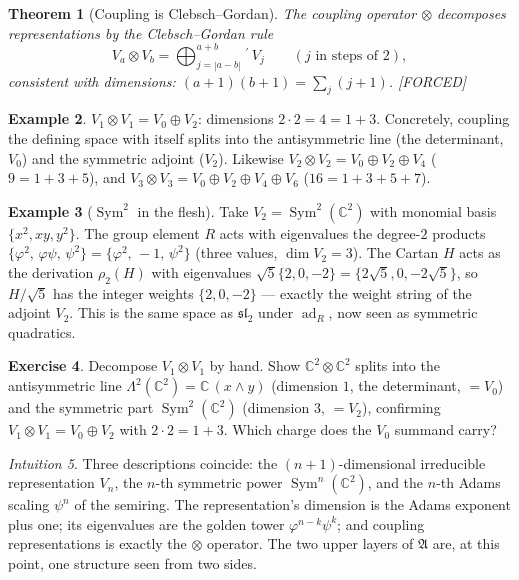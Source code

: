 \documentclass[11pt]{article}
\newcommand{\A}{𝔄}
\theoremstyle{plain}
\newtheorem{theorem}{Theorem}[section]
\theoremstyle{definition}
\newtheorem{example}[theorem]{Example}
\newtheorem{exercise}[theorem]{Exercise}
\theoremstyle{remark}
\newtheorem{intuition}[theorem]{Intuition}
\newcommand{\Forced}{\textcolor{forcedc}{[FORCED]}}
\newcommand{\ad}{\operatorname{ad}}
\begin{document}
\begin{theorem}[Coupling is Clebsch--Gordan]\label{thm:cg}
The coupling operator $⊗$ decomposes representations by the Clebsch--Gordan rule
\[
V_a⊗V_b=\bigoplus_{j=|a-b|}^{a+b}\!{}^{\,\prime}\,V_j\qquad(\text{$j$ in steps of }2),
\]
consistent with dimensions: $(a+1)(b+1)=\sum_j(j+1)$. \Forced
\end{theorem}

\begin{example}\label{ex:cg}
$V_1⊗V_1=V_0⊕V_2$: dimensions $2\cdot2=4=1+3$. Concretely, coupling the defining space with itself splits into the antisymmetric line (the determinant, $V_0$) and the symmetric adjoint ($V_2$). Likewise $V_2⊗V_2=V_0⊕V_2⊕V_4$ ($9=1+3+5$), and $V_3⊗V_3=V_0⊕V_2⊕V_4⊕V_6$ ($16=1+3+5+7$).
\end{example}

\begin{example}[$\operatorname{Sym}^{2}$ in the flesh]\label{ex:sym2}
Take $V_2=\operatorname{Sym}^{2}(ℂ^{2})$ with monomial basis $\{x^{2},xy,y^{2}\}$. The group element $R$ acts with eigenvalues the degree-$2$ products $\{φ^{2},\,φψ,\,ψ^{2}\}=\{φ^{2},\,-1,\,ψ^{2}\}$ (three values, $\dim V_2=3$). The Cartan $H$ acts as the derivation $ρ_2(H)$ with eigenvalues $\sqrt5\{2,0,-2\}=\{2\sqrt5,0,-2\sqrt5\}$, so $H/\sqrt5$ has the integer weights $\{2,0,-2\}$ --- exactly the weight string of the adjoint $V_2$. This is the same space as $𝔰𝔩_2$ under $\ad_R$, now seen as symmetric quadratics.
\end{example}

\begin{exercise}\label{exr:cg-decomp}
Decompose $V_1⊗V_1$ by hand. Show $ℂ^{2}⊗ℂ^{2}$ splits into the antisymmetric line $\Lambda^{2}(ℂ^{2})=ℂ\,(x{\wedge}y)$ (dimension $1$, the determinant, $=V_0$) and the symmetric part $\operatorname{Sym}^{2}(ℂ^{2})$ (dimension $3$, $=V_2$), confirming $V_1⊗V_1=V_0⊕V_2$ with $2\cdot2=1+3$. Which charge does the $V_0$ summand carry?
\end{exercise}

\begin{intuition}
Three descriptions coincide: the $(n{+}1)$-dimensional irreducible representation $V_n$, the $n$-th symmetric power $\operatorname{Sym}^n(ℂ^2)$, and the $n$-th Adams scaling $ψ^{n}$ of the semiring. The representation's dimension is the Adams exponent plus one; its eigenvalues are the golden tower $φ^{n-k}ψ^k$; and coupling representations is exactly the $⊗$ operator. The two upper layers of $\A$ are, at this point, one structure seen from two sides.
\end{intuition}
\end{document}
